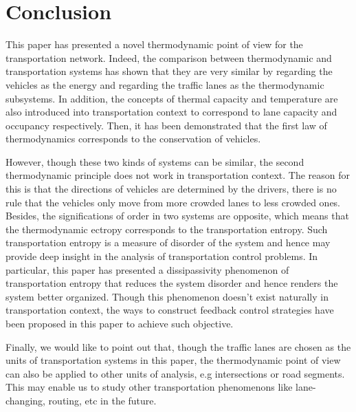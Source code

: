 \documentclass[preprint,authoryear,12pt]{elsarticle}
\begin{document}
\newpage

\section{Conclusion}

This paper has presented a novel thermodynamic point of view for the
transportation network. Indeed, the comparison between thermodynamic
and transportation systems has shown that they are very similar by
regarding the vehicles as the energy and regarding the traffic lanes
as the thermodynamic subsystems. In addition, the concepts of thermal
capacity and temperature are also introduced into transportation
context to correspond to lane capacity and occupancy respectively.
Then, it has been demonstrated that the first law of thermodynamics
corresponds to the conservation of vehicles.

However, though these two kinds of systems can be similar, the second
thermodynamic principle does not work in transportation context. The
reason for this is that  the directions of vehicles are determined by
the drivers, there is no rule that the vehicles only move from more
crowded lanes to less crowded ones. Besides, the significations of
order in two systems are opposite, which means that the thermodynamic
ectropy corresponds to the transportation entropy. Such
transportation entropy is a measure of disorder of the system and
hence may provide deep insight in the analysis of transportation
control problems.
In particular, this paper has presented a dissipassivity phenomenon
of transportation entropy that reduces the system disorder and hence
renders the system better organized.
Though this phenomenon doesn't exist naturally in transportation
context, the ways to construct feedback control strategies have been
proposed in this paper to achieve such objective.

Finally, we would like to point out that, though the traffic lanes
are chosen as the units of transportation systems in this paper, the
thermodynamic point of view can also be applied to other units of
analysis, e.g intersections or road segments. This may enable us to
study other transportation phenomenons like lane-changing, routing,
etc in the future.



\end{document}
